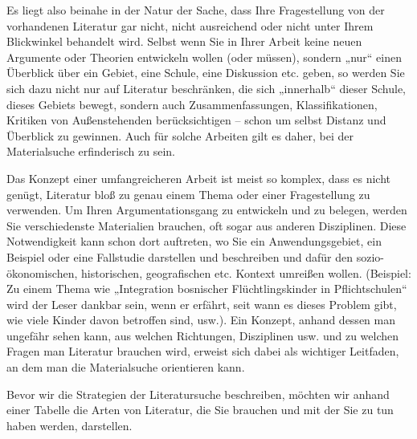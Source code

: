 \documentclass[]{book}
\theoremstyle{definition}
\theoremstyle{definition}
\theoremstyle{definition}
\theoremstyle{remark}
\begin{document}
Es liegt also beinahe in der Natur der Sache, dass Ihre Fragestellung
von der vorhandenen Literatur gar nicht, nicht ausreichend oder nicht
unter Ihrem Blickwinkel behandelt wird. Selbst wenn Sie in Ihrer Arbeit
keine neuen Argumente oder Theorien entwickeln wollen (oder müssen),
sondern „nur`` einen Überblick über ein Gebiet, eine Schule, eine
Diskussion etc. geben, so werden Sie sich dazu nicht nur auf Literatur
beschränken, die sich „innerhalb`` dieser Schule, dieses Gebiets bewegt,
sondern auch Zusammenfassungen, Klassifikationen, Kritiken von
Außenstehenden berücksichtigen -- schon um selbst Distanz und Überblick
zu gewinnen. Auch für solche Arbeiten gilt es daher, bei der
Materialsuche erfinderisch zu sein.

Das Konzept einer umfangreicheren Arbeit ist meist so komplex, dass es
nicht genügt, Literatur bloß zu genau einem Thema oder einer
Fragestellung zu verwenden. Um Ihren Argumentationsgang zu entwickeln
und zu belegen, werden Sie verschiedenste Materialien brauchen, oft
sogar aus anderen Disziplinen. Diese Notwendigkeit kann schon dort
auftreten, wo Sie ein Anwendungsgebiet, ein Beispiel oder eine
Fallstudie darstellen und beschreiben und dafür den sozio-ökonomischen,
historischen, geografischen etc. Kontext umreißen wollen. (Beispiel: Zu
einem Thema wie „Integration bosnischer Flüchtlingskinder in
Pflichtschulen`` wird der Leser dankbar sein, wenn er erfährt, seit wann
es dieses Problem gibt, wie viele Kinder davon betroffen sind, usw.).
Ein Konzept, anhand dessen man ungefähr sehen kann, aus welchen
Richtungen, Disziplinen usw. und zu welchen Fragen man Literatur
brauchen wird, erweist sich dabei als wichtiger Leitfaden, an dem man
die Materialsuche orientieren kann.

Bevor wir die Strategien der Literatursuche beschreiben, möchten wir
anhand einer Tabelle die Arten von Literatur, die Sie brauchen und mit
der Sie zu tun haben werden, darstellen.
\end{document}
